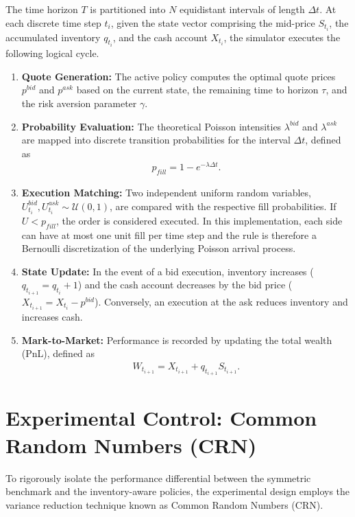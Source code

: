 \documentclass[a4paper,10pt,titlepage,oneside,openany]{book}
\theoremstyle{plain}\newtheorem{theorem}{Theorem}[chapter]
\theoremstyle{definition}\newtheorem{definition}{Definition}[chapter]
\theoremstyle{remark}\newtheorem{remark}{Remark}[chapter]
\begin{document}
The time horizon $T$ is partitioned into $N$ equidistant intervals of length $\Delta t$. At each discrete time step $t_i$, given the state vector comprising the mid-price $S_{t_i}$, the accumulated inventory $q_{t_i}$, and the cash account $X_{t_i}$, the simulator executes the following logical cycle.

\begin{enumerate}
    \item \textbf{Quote Generation:} The active policy computes the optimal quote prices $p^{bid}$ and $p^{ask}$ based on the current state, the remaining time to horizon $\tau$, and the risk aversion parameter $\gamma$.
    \item \textbf{Probability Evaluation:} The theoretical Poisson intensities $\lambda^{bid}$ and $\lambda^{ask}$ are mapped into discrete transition probabilities for the interval $\Delta t$, defined as
    \begin{align*}
        p_{fill} = 1 - e^{-\lambda \Delta t}.
    \end{align*}
    \item \textbf{Execution Matching:} Two independent uniform random variables, $U^{bid}_{t_i}, U^{ask}_{t_i} \sim \mathcal{U}(0,1)$, are compared with the respective fill probabilities. If $U < p_{fill}$, the order is considered executed. In this implementation, each side can have at most one unit fill per time step and the rule is therefore a Bernoulli discretization of the underlying Poisson arrival process.
    \item \textbf{State Update:} In the event of a bid execution, inventory increases ($q_{t_{i+1}} = q_{t_i} + 1$) and the cash account decreases by the bid price ($X_{t_{i+1}} = X_{t_i} - p^{bid}$). Conversely, an execution at the ask reduces inventory and increases cash.
    \item \textbf{Mark-to-Market:} Performance is recorded by updating the total wealth (PnL), defined as
    \begin{align*}
        W_{t_{i+1}} = X_{t_{i+1}} + q_{t_{i+1}} S_{t_{i+1}}.
    \end{align*}
\end{enumerate}

\section{Experimental Control: Common Random Numbers (CRN)}
To rigorously isolate the performance differential between the symmetric benchmark and the inventory-aware policies, the experimental design employs the variance reduction technique known as Common Random Numbers (CRN).
\end{document}
